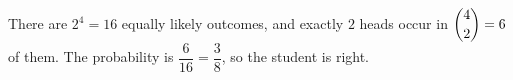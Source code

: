 There are $2^4=16$ equally likely outcomes, and exactly $2$ heads occur in $\dbinom42=6$ of them. The probability is $\dfrac{6}{16}=\boxed{\dfrac{3}{8}}$, so the student is right.
